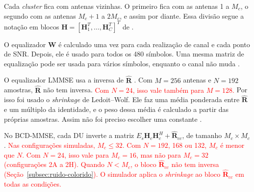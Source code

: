 
Cada \textit{cluster} fica com antenas vizinhas. O primeiro fica com as antenas 1 a $M_c$, o segundo com as antenas $M_c+1$ a $2M_c$, e assim por diante. Essa divisão segue a notação em blocos $\mathbf{H}=[\mathbf{H}_1^T,\dots,\mathbf{H}_C^T]^T$ de .

O equalizador $\mathbf{W}$ é calculado uma vez para cada realização de canal e cada ponto de SNR. Depois, ele é usado para todos os 480 símbolos. Uma mesma matriz de equalização pode ser usada para vários símbolos, enquanto o canal não muda \cite{zhao2025jsac}.



O equalizador LMMSE usa a inversa de $\hat{\mathbf{R}}$ \cite{zhao2025jsac}. Com $M = 256$ antenas e $N = 192$ amostras, $\hat{\mathbf{R}}$ não tem inversa. \textcolor{red}{Com $N = 24$, isso vale também para $M = 128$.} Por isso foi usado o \textit{shrinkage} de Ledoit--Wolf. Ele faz uma média ponderada entre $\hat{\mathbf{R}}$ e um múltiplo da identidade, e o peso dessa média é calculado a partir das próprias amostras. Assim não foi preciso escolher uma constante \cite{ledoit-wolf}.

No BCD-MMSE, cada DU inverte a matriz $E_s\mathbf{H}_c\mathbf{H}_c^H + \hat{\mathbf{R}}_{cc}$, de tamanho $M_c \times M_c$ \cite{zhao2025jsac}. \textcolor{red}{Nas configurações simuladas, $M_c \le 32$. Com $N = 192$, 168 ou 132, $M_c$ é menor que $N$. Com $N = 24$, isso vale para $M_c = 16$, mas não para $M_c = 32$ (configurações 2A a 2H). Quando $N < M_c$, o bloco $\hat{\mathbf{R}}_{cc}$ não tem inversa (Seção~\ref{subsec:ruido-colorido}). O simulador aplica o \textit{shrinkage} ao bloco $\hat{\mathbf{R}}_{cc}$ em todas as condições.}

